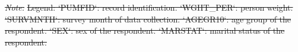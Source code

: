 \documentclass[Royal,times,sageh]{sagej}
\providecommand{\DIFdeltex}[1]{{\protect\color{red}\sout{#1}}} %
\providecommand{\DIFdelbegin}{} %
\providecommand{\DIFdel}[1]{\texorpdfstring{\DIFdeltex{#1}}{}} %
\begin{document}
\DIFdelbegin %
\textit{\DIFdel{Note: }} 
\DIFdel{Legend: `PUMFID`: record identification. `WGHT\_PER`:  person weight. `SURVMNTH`: survey month of data collection. `AGEGR10`: age group of the respondent. `SEX`: sex of the respondent. `MARSTAT`: marital status of the respondent.
}%
\end{document}
